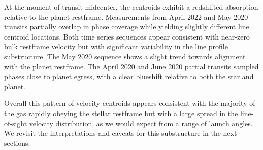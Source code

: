 \documentclass[linenumbers, twocolumn, trackchanges]{aastex631}
\begin{document}
At the moment of transit midcenter, the centroids exhibit a redshifted absorption relative to the planet restframe. Measurements from April 2022 and May 2020 transits partially overlap in phase coverage while yielding slightly different line centroid locations.  Both time series sequences appear consistent with near-zero bulk restframe velocity but with significant variability in the line profile substructure.  The May 2020 sequence shows a slight trend towards alignment with the planet restframe.  The April 2020 and June 2020 partial transits sampled phases close to planet egress, with a clear blueshift relative to both the star and planet.

Overall this pattern of velocity centroids appears consistent with the majority of the gas rapidly obeying the stellar restframe but with a large spread in the line-of-sight velocity distribution, as we would expect from a range of launch angles.  We revisit the interpretations and caveats for this substructure in the next sections.
\end{document}
